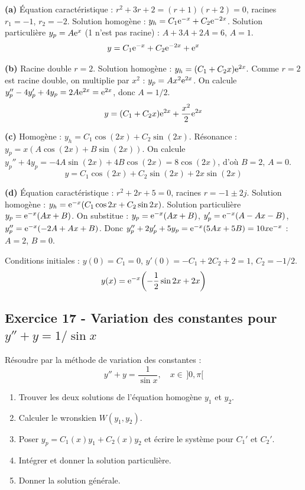\documentclass[12pt,a4paper]{article}
\begin{document}
\begin{boitecorrige}
\textbf{(a)} Équation caractéristique : $r^2+3r+2 = (r+1)(r+2) = 0$, racines $r_1=-1$, $r_2=-2$. Solution homogène : $y_h = C_1\mathrm{e}^{-x}+C_2\mathrm{e}^{-2x}$. Solution particulière $y_p = A\mathrm{e}^x$ (1 n'est pas racine) : $A+3A+2A = 6$, $A=1$.
\[
y = C_1\mathrm{e}^{-x} + C_2\mathrm{e}^{-2x} + \mathrm{e}^x
\]

\textbf{(b)} Racine double $r=2$. Solution homogène : $y_h = (C_1+C_2 x)\mathrm{e}^{2x}$.
Comme $r=2$ est racine double, on multiplie par $x^2$ : $y_p = Ax^2\mathrm{e}^{2x}$.
On calcule $y_p'' - 4y_p' + 4y_p = 2A\mathrm{e}^{2x} = \mathrm{e}^{2x}$, donc $A=1/2$.
\[
y = (C_1+C_2 x)\mathrm{e}^{2x} + \frac{x^2}{2}\mathrm{e}^{2x}
\]

\textbf{(c)} Homogène : $y_h = C_1\cos(2x)+C_2\sin(2x)$. Résonance : $y_p = x(A\cos(2x)+B\sin(2x))$.
On calcule $y_p''+4y_p = -4A\sin(2x)+4B\cos(2x) = 8\cos(2x)$, d'où $B=2$, $A=0$.
\[
y = C_1\cos(2x)+C_2\sin(2x)+2x\sin(2x)
\]

\textbf{(d)} Équation caractéristique : $r^2+2r+5=0$, racines $r=-1\pm 2j$. Solution homogène : $y_h = \mathrm{e}^{-x}(C_1\cos 2x+C_2\sin 2x)$. Solution particulière $y_p = \mathrm{e}^{-x}(Ax+B)$. On substitue : $y_p = \mathrm{e}^{-x}(Ax+B)$, $y_p' = \mathrm{e}^{-x}(A-Ax-B)$, $y_p'' = \mathrm{e}^{-x}(-2A+Ax+B)$. Donc $y_p''+2y_p'+5y_p = \mathrm{e}^{-x}(5Ax+5B) = 10x\mathrm{e}^{-x}$ : $A=2$, $B=0$.

Conditions initiales : $y(0) = C_1 = 0$, $y'(0) = -C_1+2C_2+2 = 1$, $C_2=-1/2$.
\[
y(x) = \mathrm{e}^{-x}\!\left(-\frac{1}{2}\sin 2x + 2x\right)
\]
\end{boitecorrige}

\subsection*{Exercice 17 - Variation des constantes pour $y'' + y = 1/\sin x$ \niveau{\difficile}}

\begin{boiteexercice}
Résoudre par la méthode de variation des constantes :
\[
y'' + y = \frac{1}{\sin x}, \quad x\in\,]0,\pi[
\]
\begin{enumerate}
  \item Trouver les deux solutions de l'équation homogène $y_1$ et $y_2$.
  \item Calculer le wronskien $W(y_1,y_2)$.
  \item Poser $y_p = C_1(x)y_1 + C_2(x)y_2$ et écrire le système pour $C_1'$ et $C_2'$.
  \item Intégrer et donner la solution particulière.
  \item Donner la solution générale.
\end{enumerate}
\end{boiteexercice}
\end{document}
